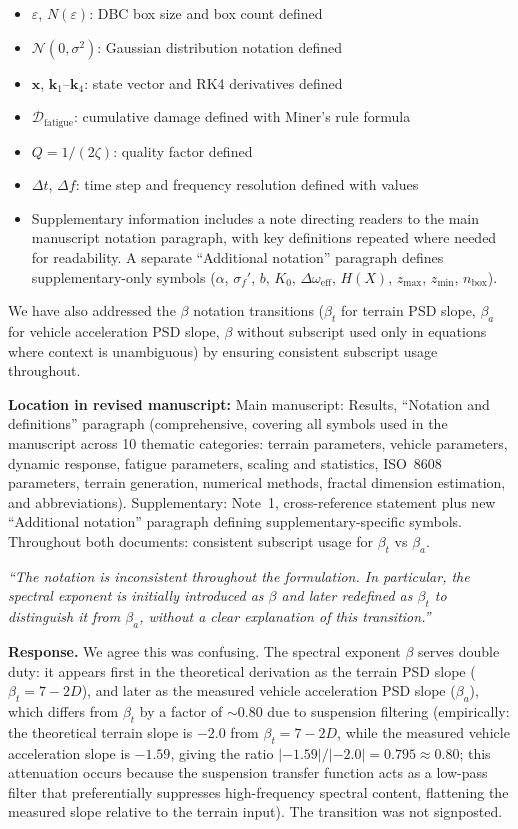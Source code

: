 \documentclass[11pt]{article}
\newcommand{\revquote}[1]{\medskip\noindent\textit{``#1''}\medskip}
\newcommand{\revloc}[1]{\noindent\textbf{Location in revised manuscript:} #1\medskip}
\begin{document}
\begin{itemize}[leftmargin=*]
\item $\varepsilon$, $N(\varepsilon)$: DBC box size and box count defined
\item $\mathcal{N}(0,\sigma^2)$: Gaussian distribution notation defined
\item $\mathbf{x}$, $\mathbf{k}_1$--$\mathbf{k}_4$: state vector and RK4 derivatives defined
\item $\mathcal{D}_{\text{fatigue}}$: cumulative damage defined with Miner's rule formula
\item $Q = 1/(2\zeta)$: quality factor defined
\item $\Delta t$, $\Delta f$: time step and frequency resolution defined with values
\item Supplementary information includes a note directing readers to the main manuscript notation paragraph, with key definitions repeated where needed for readability. A separate ``Additional notation'' paragraph defines supplementary-only symbols ($\alpha$, $\sigma_f'$, $b$, $K_0$, $\Delta\omega_{\text{eff}}$, $H(X)$, $z_{\max}$, $z_{\min}$, $n_{\text{box}}$).
\end{itemize}

\noindent We have also addressed the $\beta$ notation transitions ($\beta_t$ for terrain PSD slope, $\beta_a$ for vehicle acceleration PSD slope, $\beta$ without subscript used only in equations where context is unambiguous) by ensuring consistent subscript usage throughout.

\revloc{Main manuscript: Results, ``Notation and definitions'' paragraph (comprehensive, covering all symbols used in the manuscript across 10 thematic categories: terrain parameters, vehicle parameters, dynamic response, fatigue parameters, scaling and statistics, ISO~8608 parameters, terrain generation, numerical methods, fractal dimension estimation, and abbreviations). Supplementary: Note~1, cross-reference statement plus new ``Additional notation'' paragraph defining supplementary-specific symbols. Throughout both documents: consistent subscript usage for $\beta_t$ vs $\beta_a$.}

\bigskip

\revquote{The notation is inconsistent throughout the formulation. In particular, the spectral exponent is initially introduced as $\beta$ and later redefined as $\beta_t$ to distinguish it from $\beta_a$, without a clear explanation of this transition.}

\noindent\textbf{Response.} We agree this was confusing. The spectral exponent $\beta$ serves double duty: it appears first in the theoretical derivation as the terrain PSD slope ($\beta_t = 7-2D$), and later as the measured vehicle acceleration PSD slope ($\beta_a$), which differs from $\beta_t$ by a factor of $\sim$0.80 due to suspension filtering (empirically: the theoretical terrain slope is $-2.0$ from $\beta_t = 7-2D$, while the measured vehicle acceleration slope is $-1.59$, giving the ratio $|-1.59|/|-2.0| = 0.795 \approx 0.80$; this attenuation occurs because the suspension transfer function acts as a low-pass filter that preferentially suppresses high-frequency spectral content, flattening the measured slope relative to the terrain input). The transition was not signposted.
\end{document}

